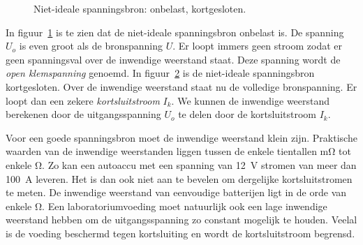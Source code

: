 \begin{figure}[!ht]
\begin{subfigure}{0.5\textwidth}
\centering
{}
\caption{}
\label{fig:gelnisopen}
\end{subfigure}%
\begin{subfigure}{0.5\textwidth}
\centering
{}
\caption{}
\label{fig:gelniskort}
\end{subfigure}
\caption{Niet-ideale spanningsbron:  onbelast,  kortgesloten.}
\label{fig:gelnisopenkort}
\end{figure}

In figuur~\ref{fig:gelnisopen} is te zien dat de niet-ideale spanningsbron onbelast is.
De spanning $U_o$ is even groot als de bronspanning $U$. Er loopt immers geen stroom zodat
er geen spanningsval over de inwendige weerstand staat. Deze spanning wordt de \textsl{open
klemspanning} genoemd. In figuur~\ref{fig:gelniskort} is
de niet-ideale spanningsbron kortgesloten. Over de inwendige weerstand staat nu de volledige
bronspanning. Er loopt dan een zekere \textsl{kortsluitstroom} $I_k$. We kunnen de inwendige
weerstand berekenen door de uitgangsspanning $U_o$ te delen door de kortsluitstroom $I_k$.

Voor een goede spanningsbron moet de inwendige weerstand klein zijn. Praktische waarden van
de inwendige weerstanden liggen tussen de enkele tientallen \si{\milli\ohm} tot enkele \si{\ohm}.
Zo kan een autoaccu met een spanning van \SI{12}{\volt} stromen van meer dan \SI{100}{\ampere}
leveren. Het is dan
ook niet aan te bevelen om dergelijke kortsluitstromen te meten. De inwendige weerstand
van eenvoudige batterijen ligt in de orde van enkele \si{\ohm}. Een laboratoriumvoeding moet
natuurlijk ook een lage inwendige weerstand hebben om de uitgangsspanning zo constant
mogelijk te houden. Veelal is de voeding beschermd tegen kortsluiting en wordt de
kortsluitstroom begrensd.


